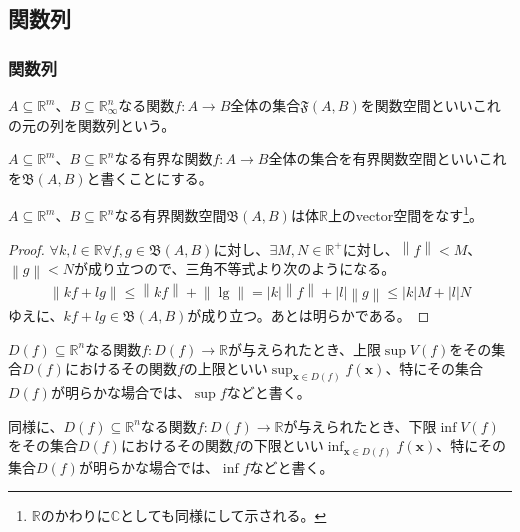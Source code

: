 \documentclass[dvipdfmx]{jsarticle}
\begin{document}
\subsection{関数列}%
\subsubsection{関数列}%
\begin{dfn}
$A \subseteq \mathbb{R}^{m}$、$B \subseteq \mathbb{R}_{\infty}^{n}$なる関数$f:A \rightarrow B$全体の集合$\mathfrak{F}(A,B)$を関数空間といいこれの元の列を関数列という。
\end{dfn}
\begin{dfn}
$A \subseteq \mathbb{R}^{m}$、$B \subseteq \mathbb{R}^{n}$なる有界な関数$f:A \rightarrow B$全体の集合を有界関数空間といいこれを$\mathfrak{B}(A,B)$と書くことにする。
\end{dfn}
\begin{thm}\label{4.1.11.1}
$A \subseteq \mathbb{R}^{m}$、$B \subseteq \mathbb{R}^{n}$なる有界関数空間$\mathfrak{B}(A,B)$は体$\mathbb{R}$上のvector空間をなす\footnote{$\mathbb{R}$のかわりに$\mathbb{C}$としても同様にして示される。}。
\end{thm}
\begin{proof}
$\forall k,l \in \mathbb{R}\forall f,g \in \mathfrak{B}(A,B)$に対し、$\exists M,N \in \mathbb{R}^{+}$に対し、$\left\| f \right\| < M$、$\left\| g \right\| < N$が成り立つので、三角不等式より次のようになる。
\begin{align*}
\left\| kf + lg \right\| \leq \left\| kf \right\| + \left\| \lg \right\| = |k|\left\| f \right\| + |l|\left\| g \right\| \leq |k|M + |l|N
\end{align*}
ゆえに、$kf + lg \in \mathfrak{B}(A,B)$が成り立つ。あとは明らかである。
\end{proof}
\begin{dfn}
$D(f) \subseteq \mathbb{R}^{n}$なる関数$f:D(f) \rightarrow \mathbb{R}$が与えられたとき、上限$\sup{V(f)}$をその集合$D(f)$におけるその関数$f$の上限といい$\sup_{\mathbf{x} \in D(f)}{f\left( \mathbf{x} \right)}$、特にその集合$D(f)$が明らかな場合では、$\sup f$などと書く。
\end{dfn}
\begin{dfn}
同様に、$D(f) \subseteq \mathbb{R}^{n}$なる関数$f:D(f) \rightarrow \mathbb{R}$が与えられたとき、下限$\inf{V(f)}$をその集合$D(f)$におけるその関数$f$の下限といい$\inf_{\mathbf{x} \in D(f)}{f\left( \mathbf{x} \right)}$、特にその集合$D(f)$が明らかな場合では、$\inf f$などと書く。
\end{dfn}
\end{document}
